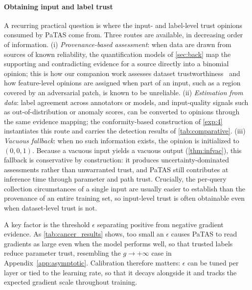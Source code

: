 \paragraph*{Obtaining input and label trust}\label{sec:acquisition}
A recurring practical question is where the input- and label-level trust opinions consumed by PaTAS come from. Three routes are available, in decreasing order of information. (i) \emph{Provenance-based assessment}: when data are drawn from sources of known reliability, the quantification models of \cref{sec:back} map the supporting and contradicting evidence for a source directly into a binomial opinion; this is how our companion work assesses dataset trustworthiness~\cite{10.1007/978-3-032-19096-3_17} and how feature-level opinions are assigned when part of an input, such as a region covered by an adversarial patch, is known to be unreliable. (ii) \emph{Estimation from data}: label agreement across annotators or models, and input-quality signals such as out-of-distribution or anomaly scores, can be converted to opinions through the same evidence mapping; the conformity-based construction of \cref{exp:4} instantiates this route and carries the detection results of \cref{tab:comparative}. (iii) \emph{Vacuous fallback}: when no such information exists, the opinion is initialized to \((0,0,1)\). Because a vacuous input yields a vacuous output (\cref{thm:infvac}), this fallback is conservative by construction: it produces uncertainty-dominated assessments rather than unwarranted trust, and PaTAS still contributes at inference time through parameter and path trust. Crucially, the per-query collection circumstances of a single input are usually easier to establish than the provenance of an entire training set, so input-level trust is often obtainable even when dataset-level trust is not.

A key factor is the threshold \(\epsilon\) separating positive from negative gradient evidence. As \cref{tab:cancer_results} shows, too small an \(\epsilon\) causes PaTAS to read gradients as large even when the model performs well, so that trusted labels reduce parameter trust, resembling the \(g \to +\infty\) case in Appendix~\ref{app:asymptotic}. Calibration therefore matters: \(\epsilon\) can be tuned per layer or tied to the learning rate, so that it decays alongside it and tracks the expected gradient scale throughout training.

